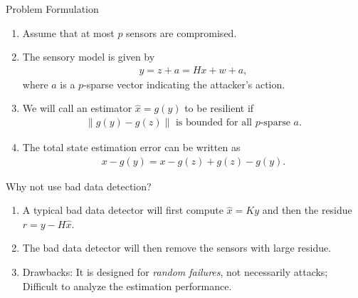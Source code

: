 \documentclass[10pt]{beamer}
\begin{document}
\begin{frame}{Problem Formulation}
  \begin{enumerate}
  \item Assume that at most $p$ sensors are compromised.
  \item The sensory model is given by
    \begin{align*}
      y = z + a = Hx + w +a,
    \end{align*}
    where $a$ is a $p$-sparse vector indicating the attacker's action.
  \item We will call an estimator $\hat x = g(y)$ to be resilient if
    \begin{align*}
      \|g(y) - g(z)\|\text{ is bounded for all $p$-sparse $a$}.
    \end{align*}
  \item The total state estimation error can be written as
    \begin{align*}
      x-g(y) = x-g(z) + g(z)-g(y).
    \end{align*}

  \end{enumerate}
\end{frame}

\begin{frame}{Why not use bad data detection?}
  \begin{center}

  \end{center}
  \begin{enumerate}
  \item A typical bad data detector will first compute $\hat x = Ky$ and then the residue $r = y - H\hat x$.
  \item The bad data detector will then remove the sensors with large residue.
  \item Drawbacks: It is designed for \emph{random failures}, not necessarily attacks; Difficult to analyze the estimation performance.
  \end{enumerate}
\end{frame}
\end{document}

